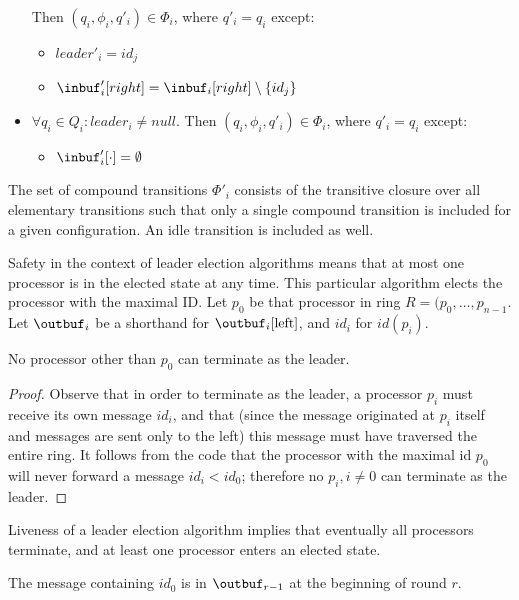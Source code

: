 \begin{itemize}
      Then $(q_i, \phi_i, q'_i) \in \Phi_i$,
      where $q'_i = q_i$ except:
      \begin{itemize}
      \item $leader'_i = id_j$
      \item $\inbuf'_i[right] = \inbuf_i[right] \setminus \{id_j\}$
      \end{itemize}
\item $\forall q_i \in Q_i: leader_i \neq null$.
      Then $(q_i, \phi_i, q'_i) \in \Phi_i$,
      where $q'_i = q_i$ except:
      \begin{itemize}
      \item $\inbuf'_i[\cdot] = \emptyset$
      \end{itemize}
\end{itemize}

The set of compound transitions $\Phi'_i$ consists of the transitive closure over all elementary
transitions such that only a single compound transition is included for a given configuration. An
idle transition is included as well.

Safety in the context of leader election algorithms means that at most one processor is in the
elected state at any time. This particular algorithm elects the processor with the maximal ID.
Let $p_0$ be that processor in ring $R = (p_0, \ldots, p_{n-1}$. Let $\outbuf_i$ be a shorthand for
$\outbuf_i[\text{left}]$, and $id_i$ for $id(p_i)$.

\begin{theorem}
No processor other than $p_0$ can terminate as the leader.
\end{theorem}

\begin{proof}
Observe that in order to terminate as the leader, a processor $p_i$ must receive its own message
$id_i$, and that (since the message originated at $p_i$ itself and messages are sent only to the left)
this message must have traversed the entire ring. It follows from the code that the processor with
the maximal id $p_0$ will never forward a message $id_i < id_0$; therefore no $p_i, i \neq 0$ can
terminate as the leader.
\end{proof}

Liveness of a leader election algorithm implies that eventually all processors terminate, and
at least one processor enters an elected state.

\begin{lemma}
The message containing $id_0$ is in $\outbuf_{r-1}$ at the beginning of round $r$.
\end{lemma}

